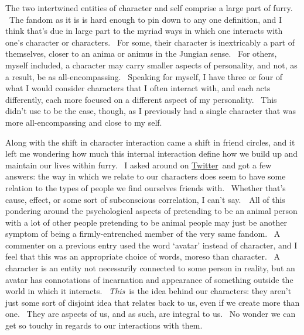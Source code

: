 The two intertwined entities of character and self comprise a large part
of furry. ~The fandom as it is is hard enough to pin down to any one
definition, and I think that's due in large part to the myriad ways in
which one interacts with one's character or characters. ~For some, their
character is inextricably a part of themselves, closer to an anima or
animus in the Jungian sense. ~For others, myself included, a character
may carry smaller aspects of personality, and not, as a result, be as
all-encompassing. ~Speaking for myself, I have three or four of what I
would consider characters that I often interact with, and each acts
differently, each more focused on a different aspect of my personality.
~This didn't use to be the case, though, as I previously had a single
character that was more all-encompassing and close to my self.

Along with the shift in character interaction came a shift in friend
circles, and it left me wondering how much this internal interaction
define how we build up and maintain our lives within furry. ~I asked
around on \href{http://twitter.com/adjspecies}{Twitter}~and got a few
answers: the way in which we relate to our characters does seem to have
some relation to the types of people we find ourselves friends with.
~Whether that's cause, effect, or some sort of subconscious correlation,
I can't say.~~All of this pondering around the psychological aspects of
pretending to be an animal person with a lot of other people pretending
to be animal people may just be another symptom of being a
firmly-entrenched member of the very same fandom. ~A commenter on a
previous entry used the word `avatar' instead of character, and I feel
that this was an appropriate choice of words, moreso than character. ~A
character is an entity not necessarily connected to some person in
reality, but an avatar has connotations of incarnation and appearance of
something outside the world in which it interacts. ~\emph{This}~is the
idea behind our characters: they aren't just some sort of disjoint idea
that relates back to us, even if we create more than one. ~They are
aspects of us, and as such, are integral to us. ~No wonder we can get so
touchy in regards to our interactions with them.
